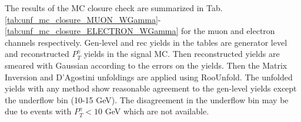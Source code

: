 
The results of the MC closure check are summarized in Tab. \ref{tab:unf_mc_closure_MUON_WGamma}-\ref{tab:unf_mc_closure_ELECTRON_WGamma} for the muon and electron channels respectively. Gen-level and rec yields in the tables are generator level and reconstructed $P_T^{\gamma}$ yields in the signal MC. Then reconstructed yields are smeared with Gaussian according to the errors on the yields. Then the Matrix Inversion and D'Agostini unfoldings are applied using RooUnfold. The unfolded yields with any method show reasonable agreement to the gen-level yields except the underflow bin (10-15 GeV). The disagreement in the underflow bin may be due to events with $P_T^{\gamma}<10$ GeV which are not available. \\ 

